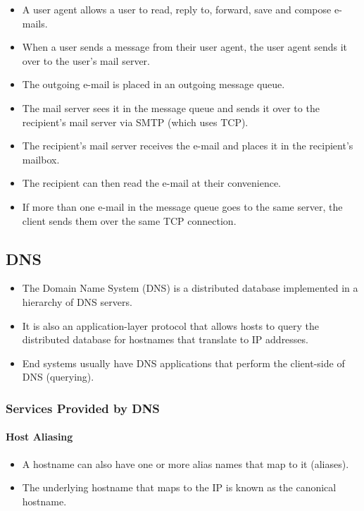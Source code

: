 \documentclass{article}
\begin{document}
\begin{itemize}
    \item A user agent allows a user to read, reply to, forward, save and compose e-mails.
    \item When a user sends a message from their user agent, the user agent sends it over to the user's mail server.
    \item The outgoing e-mail is placed in an outgoing message queue.
    \item The mail server sees it in the message queue and sends it over to the recipient's mail server via SMTP (which uses TCP).
    \item The recipient's mail server receives the e-mail and places it in the recipient's mailbox.
    \item The recipient can then read the e-mail at their convenience.
    \item If more than one e-mail in the message queue goes to the same server, the client sends them over the same TCP connection.
\end{itemize}

\subsection{DNS}

\begin{itemize}
    \item The Domain Name System (DNS) is a distributed database implemented in a hierarchy of DNS servers.
    \item It is also an application-layer protocol that allows hosts to query the distributed database for hostnames that translate to IP addresses.
    \item End systems usually have DNS applications that perform the client-side of DNS (querying).
\end{itemize}

\subsubsection{Services Provided by DNS}

\paragraph{Host Aliasing}

\begin{itemize}
    \item A hostname can also have one or more alias names that map to it (aliases).
    \item The underlying hostname that maps to the IP is known as the canonical hostname.
\end{itemize}
\end{document}
